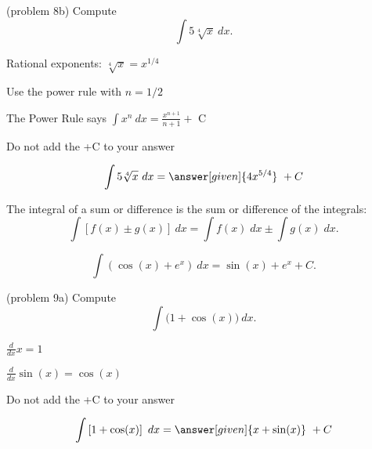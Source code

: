 \documentclass{ximera}
\begin{document}
\begin{problem}(problem 8b)
Compute 
\[
\int 5\sqrt[4]x \ dx.
\]

\begin{hint}
Rational exponents: $\sqrt[4]x = x^{1/4}$
\end{hint}
\begin{hint}
Use the power rule with $n=1/2$
\end{hint}
\begin{hint}
The Power Rule says $\int x^n \ dx = \frac{x^{n+1}}{n+1} +$ C
\end{hint}
\begin{hint}
\begin{center}
Do not add the +C to your answer
\end{center}
\end{hint}

\[
\int 5\sqrt[4]x \ dx =
\answer[given]{4x^{5/4}} \ + C
\]
\end{problem}



\begin{theorem}
The integral of a sum or difference is the sum or difference of the integrals:
\[
\int \left[f(x)\pm g(x)\right] \ dx = \int f(x) \; dx  \pm  \int g(x) \; dx.
\]
\end{theorem}



\begin{example}[example 9]
\[
\int \left(\cos(x) + e^x\right) \ dx = \sin(x) + e^x + C.
\]
\end{example}

\begin{problem}(problem 9a)
Compute
\[
\int \big(1 + \cos(x) \big) \ dx.
\]

\begin{hint}
$\frac{d}{dx} x = 1$
\end{hint}
\begin{hint}
$\frac{d}{dx} \sin(x) = \cos(x)$
\end{hint}
\begin{hint}
\begin{center}
Do not add the +C to your answer
\end{center}
\end{hint}

\[
\int \left[1 + \cos(x) \right] \ dx =
\answer[given]{x + \sin(x)} \ +  C
\]
\end{problem}
\end{document}
